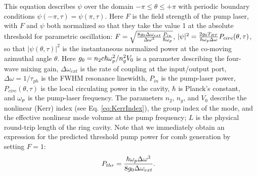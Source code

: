 This equation describes $\psi$ over the domain $-\pi\leq\theta\leq+\pi$ with periodic boundary conditions $\psi(-\pi,\tau)=\psi(\pi,\tau)$. Here $F$ is the field strength of the pump laser, with $F$ and $\psi$ both normalized so that they  take the value 1 at the absolute threshold for parametric oscillation: $F=\sqrt{\frac{8 g_0\Delta\omega_{ext}}{\Delta\omega^3}\frac{P_{in}}{\hbar \omega_{p}}}$, $|\psi|^2=\frac{2g_0T_{RT}}{\hbar\omega_{p}\Delta\omega}P_{circ}(\theta,\tau)$, so that $|\psi(\theta,\tau)|^2$ is the instantaneous normalized power at the co-moving azimuthal angle $\theta$. Here $g_0=n_2 c \hbar \omega_{p}^2/n_g^2 V_0$ is a parameter describing the four-wave mixing gain, $\Delta\omega_{ext}$ is the rate of coupling at the input/output port, $\Delta\omega=1/\tau_{ph}$ is the FWHM resonance linewidth, $P_{in}$ is the pump-laser power, $P_{circ}(\theta,\tau)$ is the local circulating power in the cavity, $\hbar$ is Planck's constant, and $\omega_{p}$ is the pump-laser frequency. The parameters $n_2$, $n_g$, and $V_0$ describe the nonlinear (Kerr) index (see Eq. \ref{eq:KerrIndex}), the group index of the mode, and the effective nonlinear mode volume at the pump frequency; $L$ is the physical round-trip length of the ring cavity. Note that we immediately obtain an expression for the predicted threshold pump power for comb generation by setting $F=1$:
\begin{equation}
P_{thr}=\frac{\hbar\omega_{p} \Delta \omega^3}{8 g_0 \Delta\omega_{ext}}.
\end{equation}

